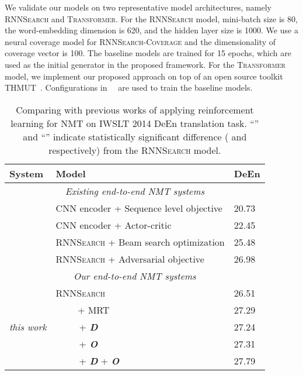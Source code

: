 \documentclass[letterpaper]{article} \usepackage{aaai19}  \usepackage{times}  \usepackage{helvet}  \usepackage{courier}  \usepackage{url}  \usepackage{graphicx}  \frenchspacing  \setlength{\pdfpagewidth}{8.5in}  \setlength{\pdfpageheight}{11in}  \usepackage{amsmath}
\begin{document}
We validate our models on two representative model architectures, namely \textsc{RNNSearch} and \textsc{Transformer}.
For the \textsc{RNNSearch} model, mini-batch size is 80, the word-embedding dimension is 620, and the hidden layer size is 1000. We use a neural coverage model for \textsc{RNNSearch-Coverage} and the dimensionality of coverage vector is 100. The baseline models are trained for 15 epochs, which are used as the initial generator in the proposed framework.
For the \textsc{Transformer} model, we implement our proposed approach on top of an open source toolkit THMUT~\cite{zhang2017thumt}. Configurations in~\citeauthor{vaswani2017attention}~ are used to train the baseline models.



\begin{table*}[t]
\centering
\begin{tabular}{l|l|l}
{\bf System} &  {\bf Model}  &   {\bf DeEn}     \\
\hline
\hline
\multicolumn{3}{c}{\em Existing end-to-end NMT systems} \\
\hline
\cite{Ranzato:2016:ICLR}    &   CNN encoder + Sequence level objective  &   20.73 \\
\cite{bahdanau2016actor}    &   CNN encoder + Actor-critic &   22.45    \\
\cite{Wiseman:2016:EMNLP}   &   \textsc{RNNSearch} + Beam search optimization   &   25.48   \\
\cite{wu2017adversarial} & \textsc{RNNSearch} + Adversarial objective &   26.98  \\
\hline
\hline
\multicolumn{3}{c}{\em Our end-to-end NMT systems} \\
\hline
\multirow{5}{*}{\em this work}  &   \textsc{RNNSearch}    &   26.51 \\
                                &    ~~~~ + MRT & 27.29  \\
                                &   ~~~~~+ {\bf \em D} &  27.24  \\
                                &   ~~~~~+ {\bf \em O} & 27.31   \\
                                &   ~~~~~+ {\bf \em D} + {\bf \em O} &   27.79  \\
\end{tabular}
\caption{Comparing with previous works of applying reinforcement learning for NMT on IWSLT 2014 DeEn translation task. ``'' and ``'' indicate statistically significant difference ( and  respectively)  from the  \textsc{RNNSearch} model. }
\label{tab:res-iwslt-en-de} 
\end{table*}
\end{document}
